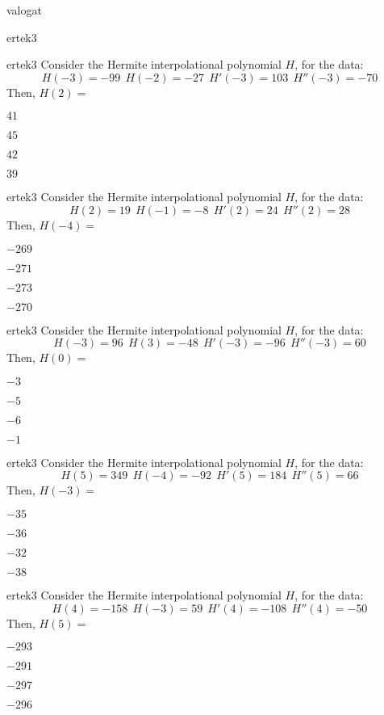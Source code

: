 \documentclass[12pt]{article}
\begin{document}
\begin{quiz}{valogat}
\begin{multi}{ertek3}
\end{multi}\begin{multi}{ertek3}
Consider the Hermite interpolational polynomial $H$, for the data:
$$
H(-3)=-99 \ \ H(-2)=-27 \ \ H'(-3)=103 \ \ H''(-3)=-70
$$
Then, $H(2)=$
\item* $ 41 $
\item  $ 45 $
\item  $ 42 $
\item  $ 39 $
\end{multi}\begin{multi}{ertek3}
Consider the Hermite interpolational polynomial $H$, for the data:
$$
H(2)=19 \ \ H(-1)=-8 \ \ H'(2)=24 \ \ H''(2)=28
$$
Then, $H(-4)=$
\item* $ -269 $
\item  $ -271 $
\item  $ -273 $
\item  $ -270 $
\end{multi}\begin{multi}{ertek3}
Consider the Hermite interpolational polynomial $H$, for the data:
$$
H(-3)=96 \ \ H(3)=-48 \ \ H'(-3)=-96 \ \ H''(-3)=60
$$
Then, $H(0)=$
\item* $ -3 $
\item  $ -5 $
\item  $ -6 $
\item  $ -1 $
\end{multi}\begin{multi}{ertek3}
Consider the Hermite interpolational polynomial $H$, for the data:
$$
H(5)=349 \ \ H(-4)=-92 \ \ H'(5)=184 \ \ H''(5)=66
$$
Then, $H(-3)=$
\item* $ -35 $
\item  $ -36 $
\item  $ -32 $
\item  $ -38 $
\end{multi}\begin{multi}{ertek3}
Consider the Hermite interpolational polynomial $H$, for the data:
$$
H(4)=-158 \ \ H(-3)=59 \ \ H'(4)=-108 \ \ H''(4)=-50
$$
Then, $H(5)=$
\item* $ -293 $
\item  $ -291 $
\item  $ -297 $
\item  $ -296 $
\end{multi}\end{quiz}
\end{document}
